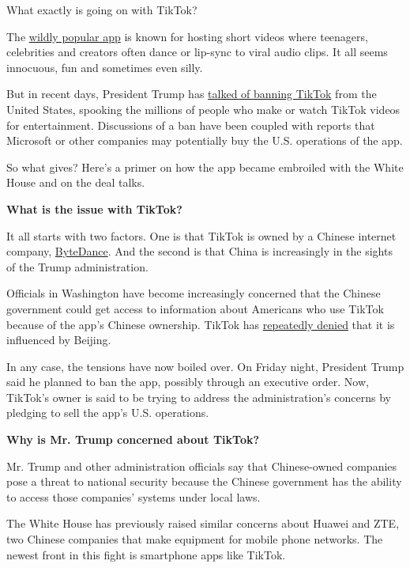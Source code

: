 What exactly is going on with TikTok?

The
\href{https://www.nytimes.com/2020/06/03/technology/tiktok-is-the-future.html}{wildly
popular app} is known for hosting short videos where teenagers,
celebrities and creators often dance or lip-sync to viral audio clips.
It all seems innocuous, fun and sometimes even silly.

But in recent days, President Trump has
\href{https://www.nytimes.com/2020/07/31/technology/tiktok-microsoft.html}{talked
of banning TikTok} from the United States, spooking the millions of
people who make or watch TikTok videos for entertainment. Discussions of
a ban have been coupled with reports that Microsoft or other companies
may potentially buy the U.S. operations of the app.

So what gives? Here's a primer on how the app became embroiled with the
White House and on the deal talks.

\textbf{What is the issue with TikTok?}

It all starts with two factors. One is that TikTok is owned by a Chinese
internet company,
\href{https://www.nytimes.com/2018/10/29/technology/bytedance-app-funding-china.html}{ByteDance}.
And the second is that China is increasingly in the sights of the Trump
administration.

Officials in Washington have become increasingly concerned that the
Chinese government could get access to information about Americans who
use TikTok because of the app's Chinese ownership. TikTok has
\href{https://www.nytimes.com/2019/11/18/technology/tiktok-alex-zhu-interview.html}{repeatedly
denied} that it is influenced by Beijing.

In any case, the tensions have now boiled over. On Friday night,
President Trump said he planned to ban the app, possibly through an
executive order. Now, TikTok's owner is said to be trying to address the
administration's concerns by pledging to sell the app's U.S. operations.

\textbf{Why is Mr. Trump concerned about TikTok?}

Mr. Trump and other administration officials say that Chinese-owned
companies pose a threat to national security because the Chinese
government has the ability to access those companies' systems under
local laws.

The White House has previously raised similar concerns about Huawei and
ZTE, two Chinese companies that make equipment for mobile phone
networks. The newest front in this fight is smartphone apps like TikTok.

